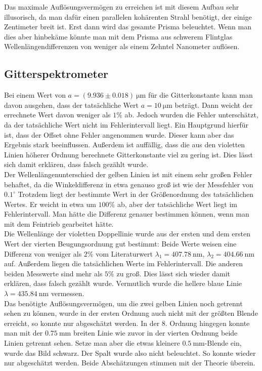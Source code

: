 \documentclass[12pt,a4paper,titlepage,headinclude,bibtotoc]{scrartcl}
\begin{document}
Das maximale Auflösungsvermögen zu erreichen ist mit diesem Aufbau sehr illusorisch, da man dafür einen parallelen kohärenten Strahl benötigt, der einige Zentimeter breit ist.
Erst dann wird das gesamte Prisma beleuchtet.
Wenn man dies aber hinbekäme könnte man mit dem Prisma aus schwerem Flintglas Wellenlängendifferenzen von weniger als einem Zehntel Nanometer auflösen.

\subsection{Gitterspektrometer}
Bei einem Wert von $a=(9.936 \pm 0.018)~\si{\micro\meter}$ für die Gitterkonstante kann man davon ausgehen, dass der tatsächliche Wert $a=10~\si{\micro\meter}$ beträgt.
Dann weicht der errechnete Wert davon weniger als $1\%$ ab.
Jedoch wurden die Fehler unterschätzt, da der tatsächliche Wert nicht im Fehlerintervall liegt.
Ein Hauptgrund hierfür ist, dass der Offset ohne Fehler angenommen wurde.
Dieser kann aber das Ergebnis stark beeinflussen.
Außerdem ist auffällig, dass die aus den violetten Linien höherer Ordnung berechnete Gitterkonstante viel zu gering ist.
Dies lässt sich damit erklären, dass falsch gezählt wurde.\\

Der Wellenlängenunterschied der gelben Linien ist mit einem sehr großen Fehler behaftet, da die Winkeldifferenz in etwa genauso groß ist wie der Messfehler von $0.1^\circ$
Trotzdem liegt der bestimmte Wert in der Größenordnung des tatsächlichen Wertes.
Er weicht in etwa um $100\%$ ab, aber der tatsächliche Wert liegt im Fehlerintervall.
Man hätte die Differenz genauer bestimmen können, wenn man mit dem Feintrieb gearbeitet hätte.\\

Die Wellenlänge der violetten Doppellinie wurde aus der ersten und dem ersten Wert der vierten Beugungsordnung gut bestimmt: Beide Werte weisen eine Differenz von weniger als $2\%$ vom Literaturwert $\lambda_1=407.78~$nm, $ \lambda_2=404.66~$nm auf.
Außerdem liegen die tatsächlichen Werte im Fehlerintervall.
Die anderen beiden Messwerte sind mehr als $5\%$ zu groß.
Dies lässt sich wieder damit erklären, dass falsch gezählt wurde.
Vermutlich wurde die hellere blaue Linie $\lambda=435.84~$nm vermessen.\\

Das benötigte Auflösungsvermögen, um die zwei gelben Linien noch getrennt sehen zu können, wurde in der ersten Ordnung auch nicht mit der größten Blende erreicht, so konnte nur abgeschätzt werden.
In der 8. Ordnung hingegen konnte man mit der $0.75~$mm breiten Linie wie zuvor in der vierten Ordnung beide Linien getrennt sehen.
Setze man aber die etwas kleinere $0.5~$mm-Blende ein, wurde das Bild schwarz.
Der Spalt wurde also nicht beleuchtet.
So konnte wieder nur abgeschätzt werden.
Beide Abschätzungen stimmen mit der Theorie überein.



\end{document}
